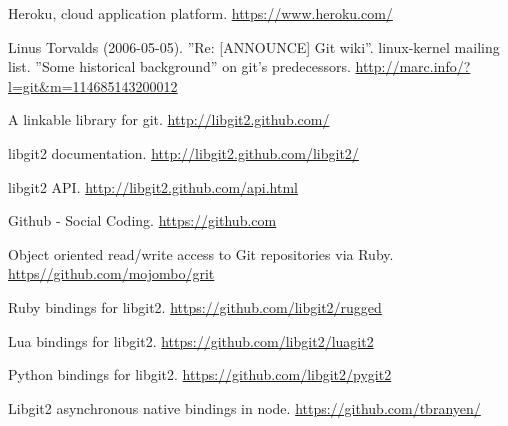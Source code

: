\begin{thebibliography}{99}
 Heroku, cloud application platform.
  \url{https://www.heroku.com/}

 Linus Torvalds (2006-05-05). ”Re: [ANNOUNCE] Git wiki”.
  linux-kernel mailing list. ”Some historical background” on git’s predecessors.
  \url{http://marc.info/?l=git\&m=114685143200012}

 A linkable library for git.
  \url{http://libgit2.github.com/}

 libgit2 documentation.
  \url{http://libgit2.github.com/libgit2/}

 libgit2 API.
  \url{http://libgit2.github.com/api.html}

 Github - Social Coding.
  \url{https://github.com}

 Object oriented read/write access to Git repositories via Ruby.
  \url{https//github.com/mojombo/grit}

 Ruby bindings for libgit2.
  \url{https://github.com/libgit2/rugged}

 Lua bindings for libgit2.
  \url{https://github.com/libgit2/luagit2}

 Python bindings for libgit2.
  \url{https://github.com/libgit2/pygit2}

 Libgit2 asynchronous native bindings in node.
  \url{https://github.com/tbranyen/}

\end{thebibliography}
